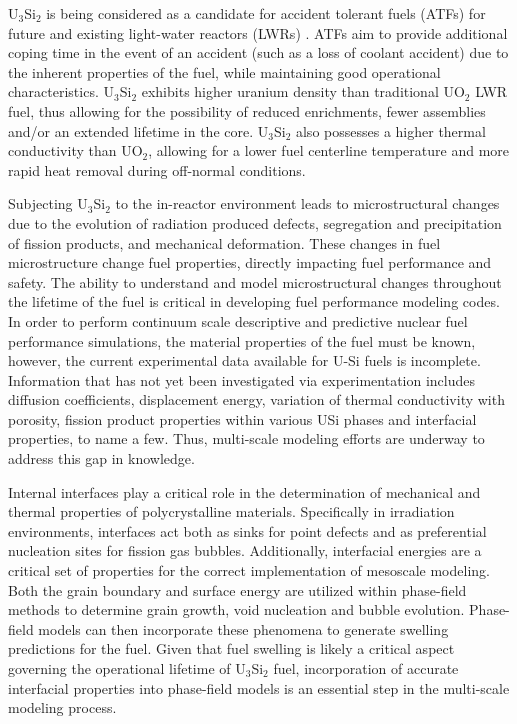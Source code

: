 \documentclass[review]{elsarticle}
\begin{document}
U$_{3}$Si$_{2}$ is being considered as a candidate for accident tolerant fuels (ATFs) for future and existing light-water reactors (LWRs) \cite{zinkle2014, zinkle2016}. ATFs aim to provide additional coping time in the event of an accident (such as a loss of coolant accident) due to the inherent properties of the fuel, while maintaining good operational characteristics. U$_{3}$Si$_{2}$ exhibits higher uranium density than traditional UO$_{2}$ LWR fuel, thus allowing for the possibility of reduced enrichments, fewer assemblies and/or an extended lifetime in the core. U$_{3}$Si$_{2}$ also possesses a higher thermal conductivity than UO$_{2}$, allowing for a lower fuel centerline temperature and more rapid heat removal during off-normal conditions. 

Subjecting U$_{3}$Si$_{2}$ to the in-reactor environment leads to microstructural changes due to the evolution of radiation produced defects, segregation and precipitation of fission products, and mechanical deformation. These changes in fuel microstructure change fuel properties, directly impacting fuel performance and safety. The ability to understand and model microstructural changes throughout the lifetime of the fuel is critical in developing fuel performance modeling codes. In order to perform continuum scale descriptive and predictive nuclear fuel performance simulations, the material properties of the fuel must be known, however, the current experimental data available for U-Si fuels is incomplete. Information that has not yet been investigated via experimentation includes diffusion coefficients, displacement energy, variation of thermal conductivity with porosity, fission product properties within various USi phases and interfacial properties, to name a few. Thus, multi-scale modeling efforts are underway to address this gap in knowledge.

Internal interfaces play a critical role in the determination of mechanical and thermal properties of polycrystalline materials. Specifically in irradiation environments, interfaces act both as sinks for point defects and as preferential nucleation sites for fission gas bubbles. Additionally, interfacial energies are a critical set of properties for the correct implementation of mesoscale modeling. Both the grain boundary and surface energy are utilized within phase-field methods to determine grain growth, void nucleation and bubble evolution. Phase-field models can then incorporate these phenomena to generate swelling predictions for the fuel. Given that fuel swelling is likely a critical aspect governing the operational lifetime of U$_{3}$Si$_{2}$ fuel, incorporation of accurate interfacial properties into phase-field models is an essential step in the multi-scale modeling process.
\end{document}
